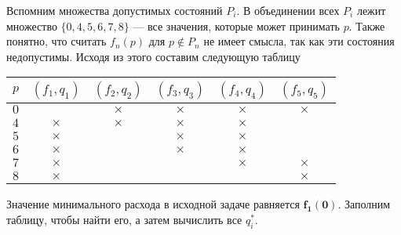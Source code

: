 Вспомним множества допустимых состояний $P_i$. В объединении всех $P_i$ лежит множество $\{0, 4, 5, 6, 7, 8\}$ --- все значения, которые может принимать $p$. Также понятно, что считать $f_n(p)$ для $p \notin P_n$ не имеет смысла, так как эти состояния недопустимы. Исходя из этого составим следующую таблицу

\begin{table}[H]
	\centering
	\begin{tabular}{ | c | c | c | c | c | c | } 
		\hline
		$p$ & $(f_1, q_1)$ & $(f_2, q_2)$ & $(f_3, q_3)$ & $(f_4, q_4)$ & $(f_5, q_5)$ \\ 
		\hline
		$0$ & & $\times$ & $\times$ & $\times$ & $\times$ \\\hline
		$4$ & $\times$ & $\times$ & $\times$ & $\times$ & \\\hline
		$5$ & $\times$ & & $\times$ & $\times$ & \\\hline
		$6$ & $\times$ & & $\times$ & $\times$ & \\\hline
		$7$ & $\times$ & & & $\times$ & $\times$ \\\hline
		$8$ & $\times$ & & & & $\times$ \\\hline
	\end{tabular}
\end{table}

Значение минимального расхода в исходной задаче равняется $\mathbf {f_1(0)}$. Заполним таблицу, чтобы найти его, а затем вычислить все $q^*_i$.

\bigskip

